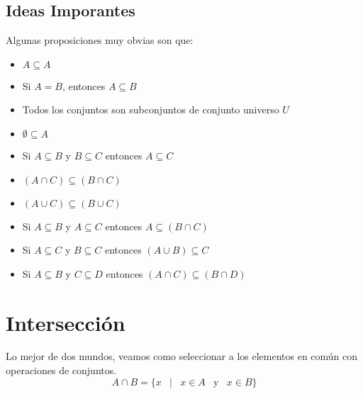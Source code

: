\documentclass[12pt, fleqn]{report}                             %
\DeclareMathOperator \Space     {\quad}                         %
\DeclareMathOperator \MiniSpace {\;}                            %
\newcommand \Such           {\MiniSpace | \MiniSpace}           %
\newcommand \Also           {\MiniSpace \text{y} \MiniSpace}    %
\theoremstyle{break}                                            %
\begin{document}
            \subsection{Ideas Imporantes}

                Algunas proposiciones muy obvias son que:
                \begin{itemize}
                    \item $A \subseteq A$
                    \item Si $A = B$, entonces $A \subseteq B$
                    \item Todos los conjuntos son subconjuntos de conjunto universo $U$
                    \item $\emptyset \subseteq A$
                    \item Si $A \subseteq B$ y $B \subseteq C$ entonces $A \subseteq C$
                    \item $(A \cap C) \subseteq (B \cap C)$
                    \item $(A \cup C) \subseteq (B \cup C)$
                    \item Si $A \subseteq B$ y $A \subseteq C$ entonces $A \subseteq (B \cap C)$
                    \item Si $A \subseteq C$ y $B \subseteq C$ entonces $(A \cup B) \subseteq C$
                    \item Si $A \subseteq B$ y $C \subseteq D$ entonces $(A \cap C) \subseteq (B \cap D)$
                \end{itemize}









        \clearpage
        \section{Intersección}

            Lo mejor de dos mundos, veamos como seleccionar a los elementos en común con operaciones
            de conjuntos.
            \begin{equation*}
                A \cap B = \{ x \Such x \in A \Also x \in B \}
            \end{equation*}
\end{document}
